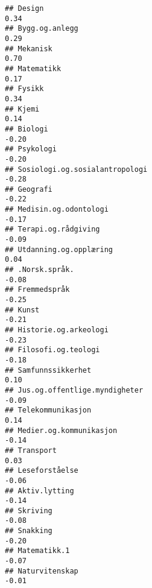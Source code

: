 \documentclass[
]{article}
\begin{document}
\begin{verbatim}
## Design                                                                            0.34
## Bygg.og.anlegg                                                                    0.29
## Mekanisk                                                                          0.70
## Matematikk                                                                        0.17
## Fysikk                                                                            0.34
## Kjemi                                                                             0.14
## Biologi                                                                          -0.20
## Psykologi                                                                        -0.20
## Sosiologi.og.sosialantropologi                                                   -0.28
## Geografi                                                                         -0.22
## Medisin.og.odontologi                                                            -0.17
## Terapi.og.rådgiving                                                              -0.09
## Utdanning.og.opplæring                                                            0.04
## .Norsk.språk.                                                                    -0.08
## Fremmedspråk                                                                     -0.25
## Kunst                                                                            -0.21
## Historie.og.arkeologi                                                            -0.23
## Filosofi.og.teologi                                                              -0.18
## Samfunnssikkerhet                                                                 0.10
## Jus.og.offentlige.myndigheter                                                    -0.09
## Telekommunikasjon                                                                 0.14
## Medier.og.kommunikasjon                                                          -0.14
## Transport                                                                         0.03
## Leseforståelse                                                                   -0.06
## Aktiv.lytting                                                                    -0.14
## Skriving                                                                         -0.08
## Snakking                                                                         -0.20
## Matematikk.1                                                                     -0.07
## Naturvitenskap                                                                   -0.01

\end{verbatim}
\end{document}
